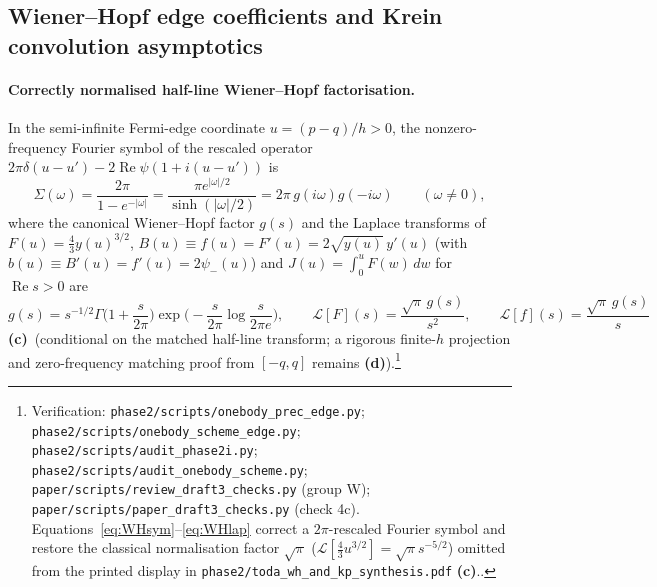 \documentclass[11pt,a4paper]{article}
\newcommand{\lab}[1]{{\normalfont\sffamily\footnotesize\bfseries(#1)}}
\newcommand{\Lc}{\lab{c}}
\newcommand{\Ld}{\lab{d}}
\newcommand{\scr}[1]{\nolinkurl{#1}}
\newcommand{\chk}[1]{\footnote{\raggedright Verification: #1.}}
\theoremstyle{remark}
\begin{document}
\subsection{Wiener--Hopf edge coefficients and Krein convolution asymptotics}\label{sec:wh}

\paragraph{Correctly normalised half-line Wiener--Hopf factorisation.} In the semi-infinite Fermi-edge coordinate $u=(p-q)/h>0$, the nonzero-frequency Fourier symbol of the rescaled operator $2\pi\delta(u-u')-2\operatorname{Re}\psi(1+i(u-u'))$ is
\begin{equation}\label{eq:WHsym}
\Sigma(\omega)=\frac{2\pi}{1-e^{-|\omega|}}=\frac{\pi e^{|\omega|/2}}{\sinh(|\omega|/2)}=2\pi\,g(i\omega)g(-i\omega)\qquad(\omega\neq0),
\end{equation}
where the canonical Wiener--Hopf factor $g(s)$ and the Laplace transforms of $F(u)=\tfrac43y(u)^{3/2}$, $B(u)\equiv f(u)=F'(u)=2\sqrt{y(u)}\,y'(u)$ (with $b(u)\equiv B'(u)=f'(u)=2\psi_-(u)$) and $J(u)=\int_0^uF(w)\,dw$ for $\operatorname{Re}s>0$ are
\begin{equation}\label{eq:WHlap}
g(s)=s^{-1/2}\Gamma\Big(1+\frac{s}{2\pi}\Big)\exp\Big(-\frac{s}{2\pi}\log\frac{s}{2\pi e}\Big),\qquad
\mathcal L[F](s)=\frac{\sqrt\pi\,g(s)}{s^2},\qquad
\mathcal L[f](s)=\frac{\sqrt\pi\,g(s)}{s}
\end{equation}
\Lc\ (conditional on the matched half-line transform; a rigorous finite-$h$ projection and zero-frequency matching proof from $[-q,q]$ remains \Ld).\chk{\scr{phase2/scripts/onebody_prec_edge.py}; \scr{phase2/scripts/onebody_scheme_edge.py}; \scr{phase2/scripts/audit_phase2i.py}; \scr{phase2/scripts/audit_onebody_scheme.py}; \scr{paper/scripts/review_draft3_checks.py} (group W); \scr{paper/scripts/paper_draft3_checks.py} (check 4c). Equations~\eqref{eq:WHsym}--\eqref{eq:WHlap} correct a $2\pi$-rescaled Fourier symbol and restore the classical normalisation factor $\sqrt\pi$ ($\mathcal L[\tfrac43u^{3/2}]=\sqrt\pi s^{-5/2}$) omitted from the printed display in \scr{phase2/toda_wh_and_kp_synthesis.pdf} \Lc.}
\end{document}
